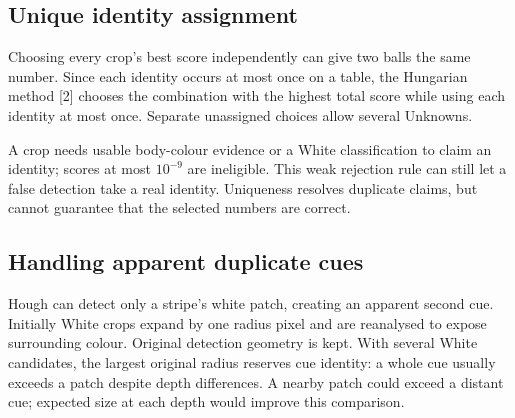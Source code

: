 \documentclass[12pt,a4paper]{article}
\begin{document}
\subsection{Unique identity assignment}

Choosing every crop's best score independently can give two balls the same number.
Since each identity occurs at most once on a table, the Hungarian method [2]
chooses the combination with the highest total score while using each identity
at most once. Separate unassigned choices allow several Unknowns.

A crop needs usable body-colour evidence or a White classification to claim an
identity; scores at most $10^{-9}$ are ineligible. This weak rejection rule can
still let a false detection take a real identity. Uniqueness resolves duplicate
claims, but cannot guarantee that the selected numbers are correct.
\newpage

\subsection{Handling apparent duplicate cues}

Hough can detect only a stripe's white patch, creating an apparent second cue.
Initially White crops expand by one radius pixel and are reanalysed to expose
surrounding colour. Original detection geometry is kept. With several White
candidates, the largest original radius reserves cue identity: a whole cue usually
exceeds a patch despite depth differences. A nearby patch could exceed a distant
cue; expected size at each depth would improve this comparison.

\end{document}
